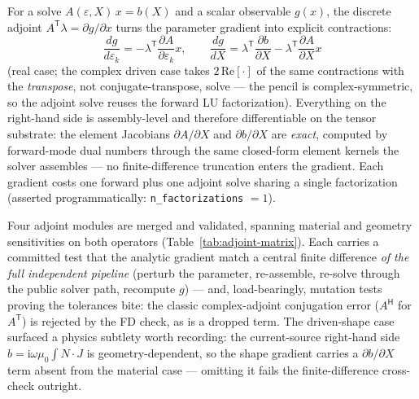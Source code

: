 \documentclass{anvil-paper}
\begin{document}
For a solve $A(\varepsilon, X)\,x = b(X)$ and a scalar observable
$g(x)$, the discrete adjoint $A^{\mathsf{T}}\lambda = \partial g/\partial
x$ turns the parameter gradient into explicit contractions:
\begin{equation}
  \frac{dg}{d\varepsilon_k}
    = -\lambda^{\mathsf{T}}\frac{\partial A}{\partial \varepsilon_k}x,
  \qquad
  \frac{dg}{dX}
    = \lambda^{\mathsf{T}}\frac{\partial b}{\partial X}
      - \lambda^{\mathsf{T}}\frac{\partial A}{\partial X}x
  \label{eq:adjoint}
\end{equation}
(real case; the complex driven case takes $2\,\mathrm{Re}[\cdot]$ of the
same contractions with the \emph{transpose}, not conjugate-transpose,
solve --- the pencil is complex-symmetric, so the adjoint solve reuses
the forward LU factorization). Everything on the right-hand side is
assembly-level and therefore differentiable on the tensor substrate: the
element Jacobians $\partial A/\partial X$ and $\partial b/\partial X$ are
\emph{exact}, computed by forward-mode dual numbers through the same
closed-form element kernels the solver assembles --- no finite-difference
truncation enters the gradient. Each gradient costs one forward plus one
adjoint solve sharing a single factorization (asserted programmatically:
\texttt{n\_factorizations} $= 1$).

Four adjoint modules are merged and validated, spanning material and
geometry sensitivities on both operators
(Table~\ref{tab:adjoint-matrix}). Each carries a committed test that the
analytic gradient match a central finite difference \emph{of the full
independent pipeline} (perturb the parameter, re-assemble, re-solve
through the public solver path, recompute $g$) --- and, load-bearingly,
mutation tests proving the tolerances bite: the classic complex-adjoint
conjugation error ($A^{\mathsf{H}}$ for $A^{\mathsf{T}}$) is rejected by
the FD check, as is a dropped term. The driven-shape case surfaced a
physics subtlety worth recording: the current-source right-hand side
$b = \mathrm{i}\omega\mu_0\!\int\! N\cdot J$ is geometry-dependent, so
the shape gradient carries a $\partial b/\partial X$ term absent from the
material case --- omitting it fails the finite-difference cross-check
outright.
\end{document}
